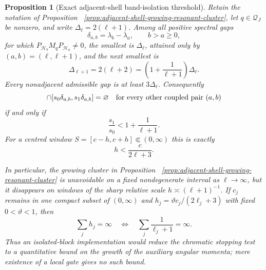\documentclass[11pt]{article}
\newtheorem{proposition}[theorem]{Proposition}
\theoremstyle{remark}
\begin{document}
\begin{proposition}[Exact adjacent-shell band-isolation threshold]
\label{prop:adjacent-shell-band-isolation}
Retain the notation of Proposition
~\ref{prop:adjacent-shell-growing-resonant-cluster}, let $q\in\mathcal Q_J$ be
nonzero, and write $\Delta_\ell=2(\ell+1)$.  Among all positive spectral gaps
\[
 \delta_{a,b}=\lambda_b-\lambda_a,\qquad b>a\geq0,
\]
for which
$P_{\mathcal H_b}M_qP_{\mathcal H_a}\neq0$, the smallest is
$\Delta_\ell$, attained only by $(a,b)=(\ell,\ell+1)$, and the next smallest
is
\[
 \Delta_{\ell+1}=2(\ell+2)
 =\left(1+\frac1{\ell+1}\right)\Delta_\ell .
\]
Every nonadjacent admissible gap is at least $3\Delta_\ell$.  Consequently
\begin{equation}
 [s_0\Delta_\ell,s_1\Delta_\ell]
 \cap[s_0\delta_{a,b},s_1\delta_{a,b}]
 =\varnothing
 \quad\hbox{for every other coupled pair }(a,b)
 \label{eq:adjacent-shell-all-band-isolation}
\end{equation}
if and only if
\begin{equation}
 \frac{s_1}{s_0}<1+\frac1{\ell+1}.
 \label{eq:adjacent-shell-ratio-threshold}
\end{equation}
For a centred window $S=[c-h,c+h]\Subset(0,\infty)$ this is exactly
\begin{equation}
 h<\frac{c}{2\ell+3}.
 \label{eq:adjacent-shell-centred-halfwidth}
\end{equation}

In particular, the growing cluster in Proposition
~\ref{prop:adjacent-shell-growing-resonant-cluster} is unavoidable on a fixed
nondegenerate interval as $\ell\to\infty$, but it disappears on windows of
the sharp relative scale $h\asymp(\ell+1)^{-1}$.  If
$c_j$ remains in one compact subset of $(0,\infty)$ and
$h_j=\vartheta c_j/(2\ell_j+3)$ with fixed $0<\vartheta<1$, then
\begin{equation}
 \sum_j h_j=\infty
 \quad\Longleftrightarrow\quad
 \sum_j\frac1{\ell_j+1}=\infty.
 \label{eq:adjacent-shell-harmonic-hazard}
\end{equation}
Thus an isolated-block implementation would reduce the chromatic stopping
test to a quantitative bound on the growth of the auxiliary angular momenta;
mere existence of a local gate gives no such bound.
\end{proposition}
\end{document}
